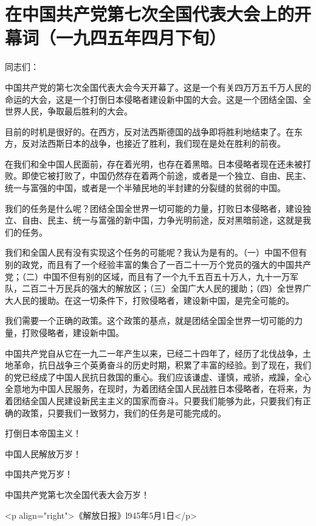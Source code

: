 \section[在中国共产党第七次全国代表大会上的开幕词（一九四五年四月下旬）]{在中国共产党第七次全国代表大会上的开幕词（一九四五年四月下旬）}


同志们：


中国共产党的第七次全国代表大会今天开幕了。这是一个有关四万万五千万人民的命运的大会，这是一个打倒日本侵略者建设新中国的大会。这是一个团结全国、全世界人民，争取最后胜利的大会。

目前的时机是很好的。在西方，反对法西斯德国的战争即将胜利地结束了。在东方，反对法西斯日本的战争，也接近了胜利，我们现在是处在胜利的前夜。

在我们和全中国人民面前，存在着光明，也存在着黑暗。日本侵略者现在还未被打败。即使它被打败了，中国仍然存在着两个前途，或者是一个独立、自由、民主、统一与富强的中国，或者是一个半殖民地的半封建的分裂缝的贫弱的中国。

我们的任务是什么呢？团结全国全世界一切可能的力量，打败日本侵略者，建设独立、自由、民主、统一与富强的新中国，力争光明前途，反对黑暗前途，这就是我们的任务。

我们和全国人民有没有实现这个任务的可能呢？我认为是有的。（一）中国不但有别的政党，而且有了一个经验丰富的集合了一百二十一万个党员的强大的中国共产党；（二）中国不但有别的区域，而且有了一个九千五百五十万人，九十一万军队，二百二十万民兵的强大的解放区；（三）全国广大人民的援助；（四）全世界广大人民的援助。在这一切条件下，打败侵略者，建设新中国，是完全可能的。

我们需要一个正确的政策。这个政策的基点，就是团结全国全世界一切可能的力量，打败侵略者，建设新中国。

中国共产党自从它在一九二一年产生以来，已经二十四年了，经历了北伐战争，土地革命，抗日战争三个英勇奋斗的历史时期，积累了丰富的经验。到了现在，我们的党已经成了中国人民抗日救国的重心。我们应该谦虚、谨慎，戒骄，戒躁，全心全意地为中国人民服务，在现时，为着团结全国人民战胜日本侵略者，在将来，为着团结全国人民建设新民主主义的国家而奋斗。只要我们能够为此，只要我们有正确的政策，只要我们一致努力，我们的任务是可能完成的。

打倒日本帝国主义！

中国人民解放万岁！

中国共产党万岁！

中国共产党第七次全国代表大会万岁！

<p align="right">《解放日报》l945年5月1日</p>

